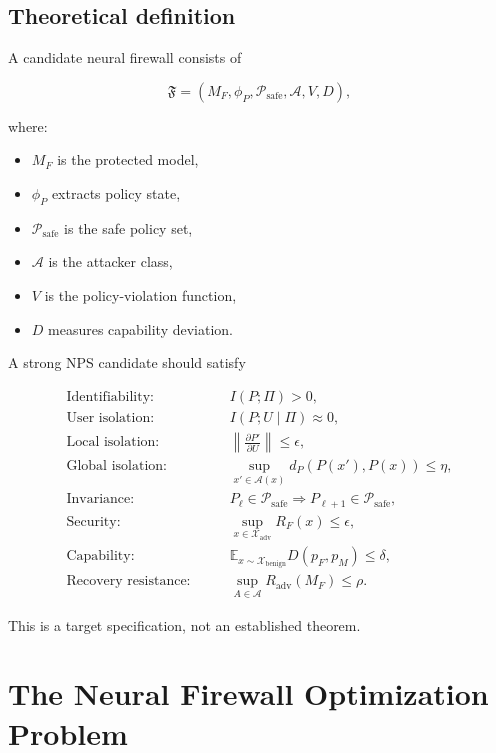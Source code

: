\documentclass[11pt]{article}
\newcommand{\X}{\mathcal{X}}
\newcommand{\A}{\mathcal{A}}
\newcommand{\Psafe}{\mathcal{P}_{\mathrm{safe}}}
\newcommand{\E}{\mathbb{E}}
\begin{document}
\subsection*{Theoretical definition}

A candidate neural firewall consists of

\begin{equation}
\mathfrak F=
(M_F,\phi_P,\Psafe,\mathcal A,V,D),
\end{equation}

where:

\begin{itemize}
    \item $M_F$ is the protected model,
    \item $\phi_P$ extracts policy state,
    \item $\Psafe$ is the safe policy set,
    \item $\mathcal A$ is the attacker class,
    \item $V$ is the policy-violation function,
    \item $D$ measures capability deviation.
\end{itemize}

A strong NPS candidate should satisfy

\begin{align}
\text{Identifiability:}\qquad
&I(P;\Pi)>0,
\\
\text{User isolation:}\qquad
&I(P;U\mid\Pi)\approx0,
\\
\text{Local isolation:}\qquad
&
\left\|
\frac{\partial P'}{\partial U}
\right\|
\leq\epsilon,
\\
\text{Global isolation:}\qquad
&
\sup_{x'\in\A(x)}
d_P(P(x'),P(x))
\leq\eta,
\\
\text{Invariance:}\qquad
&
P_\ell\in\Psafe
\Rightarrow
P_{\ell+1}\in\Psafe,
\\
\text{Security:}\qquad
&
\sup_{x\in\X_{\mathrm{adv}}}R_F(x)
\leq\epsilon,
\\
\text{Capability:}\qquad
&
\E_{x\sim\X_{\mathrm{benign}}}D(p_F,p_M)
\leq\delta,
\\
\text{Recovery resistance:}\qquad
&
\sup_{A\in\mathcal A}R_{\mathrm{adv}}(M_F)
\leq\rho.
\end{align}

This is a target specification, not an established theorem.

\section{The Neural Firewall Optimization Problem}
\end{document}
